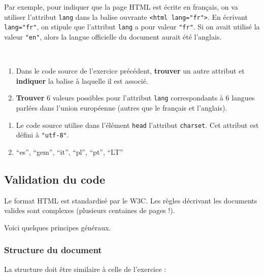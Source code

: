 \documentclass[a4paper,12pt]{article}
\newenvironment{eleve}%
{\begin{activite}\color{noiramu}\\}
{\end{activite}}
\providecommand{\tightlist}{%
      \setlength{\itemsep}{0pt}\setlength{\parskip}{0pt}}
\begin{document}
Par exemple, pour indiquer que la page HTML est écrite en français, on
va utiliser l'attribut \texttt{lang} dans la balise ouvrante
\texttt{\textless{}html\ lang="fr"\textgreater{}}. En écrivant
\texttt{lang="fr"}, on stipule que l'attribut \texttt{lang} a pour
valeur \texttt{"fr"}. Si on avait utilisé la valeur \texttt{"en"}, alors
la langue officielle du document aurait été l'anglais.
\begin{eleve}
    \begin{enumerate}
\def\labelenumi{\arabic{enumi}.}
\tightlist
\item
  Dans le code source de l'exercice précédent, \textbf{trouver} un autre
  attribut et \textbf{indiquer} la balise à laquelle il est associé.
\item
  \textbf{Trouver} 6 valeurs possibles pour l'attribut \texttt{lang}
  correspondants à 6 langues parlées dans l'union européenne (autres que
  le français et l'anglais).
\end{enumerate}
        
        \end{eleve}\begin{methode}
    \begin{enumerate}
\def\labelenumi{\arabic{enumi}.}
\tightlist
\item
  Le code source utilise dans l'élément \texttt{head} l'attribut
  \texttt{charset}. Cet attribut est défini à \texttt{"utf-8"}.
\item
  ``es'', ``gem'', ``it'', ``pl'', ``pt'', ``LT''
\end{enumerate}

        \end{methode}
    \hypertarget{validation-du-code}{%
\subsection{Validation du code}\label{validation-du-code}}

    Le format HTML est standardisé par le W3C. Les règles décrivant les
documents valides sont complexes (plusieurs centaines de pages !).

Voici quelques principes généraux.

\hypertarget{structure-du-document}{%
\subsubsection{Structure du document}\label{structure-du-document}}

La structure doit être similaire à celle de l'exercice :
\end{document}
